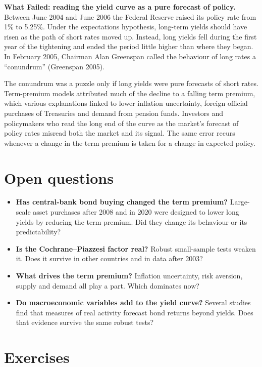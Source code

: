 \begin{callout}
\textbf{What Failed: reading the yield curve as a pure forecast of policy.} Between June 2004 and June 2006 the Federal Reserve raised its policy rate from 1\% to 5.25\%. Under the expectations hypothesis, long-term yields should have risen as the path of short rates moved up. Instead, long yields fell during the first year of the tightening and ended the period little higher than where they began. In February 2005, Chairman Alan Greenspan called the behaviour of long rates a ``conundrum'' (Greenspan 2005).

The conundrum was a puzzle only if long yields were pure forecasts of short rates. Term-premium models attributed much of the decline to a falling term premium, which various explanations linked to lower inflation uncertainty, foreign official purchases of Treasuries and demand from pension funds. Investors and policymakers who read the long end of the curve as the market's forecast of policy rates misread both the market and its signal. The same error recurs whenever a change in the term premium is taken for a change in expected policy.
\end{callout}

\section{Open questions}
\label{sec:16-open}

\begin{itemize}
  \item \textbf{Has central-bank bond buying changed the term premium?} Large-scale asset purchases after 2008 and in 2020 were designed to lower long yields by reducing the term premium. Did they change its behaviour or its predictability?
  \item \textbf{Is the Cochrane--Piazzesi factor real?} Robust small-sample tests weaken it. Does it survive in other countries and in data after 2003?
  \item \textbf{What drives the term premium?} Inflation uncertainty, risk aversion, supply and demand all play a part. Which dominates now?
  \item \textbf{Do macroeconomic variables add to the yield curve?} Several studies find that measures of real activity forecast bond returns beyond yields. Does that evidence survive the same robust tests?
\end{itemize}

\section*{Exercises}

